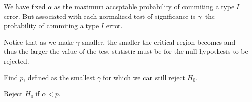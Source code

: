 \documentclass[12pt]{article}
\begin{document}
We have fixed $\alpha$ as the maximum acceptable probability of commiting a
type $I$ error.  But associated with each normalized test of significance is
$\gamma$, the probability of commiting a type $I$ error.

Notice that as we make $\gamma$ smaller, the smaller the critical region
becomes and thus the larger the value of the test statistic must be for the
null hypothesis to be rejected.

Find $p$, defined as the smallest $\gamma$ for which we can still reject
$H_0$.

Reject $H_0$ if $\alpha < p$.
\end{document}
